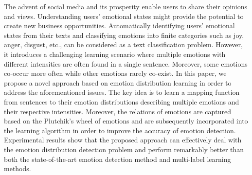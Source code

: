 The advent of social media and its prosperity enable users to share their opinions and views. Understanding users' emotional states might provide the potential to create new business opportunities. Automatically identifying users' emotional states from their texts and classifying emotions into finite categories such as joy, anger, disgust, etc., can be considered as a text classification problem. However, it introduces a challenging learning scenario where multiple emotions with different intensities are often found in a single sentence. Moreover, some emotions co-occur more often while other emotions rarely co-exist. In this paper, we propose a novel approach based on emotion distribution learning in order to address the aforementioned issues. The key idea is to learn a  mapping function from sentences to their emotion distributions describing multiple emotions and their respective intensities. Moreover, the relations of emotions are captured based on the Plutchik's wheel of emotions and are subsequently incorporated into the learning algorithm in order to improve the accuracy of emotion detection. Experimental results show that the proposed approach can effectively deal with the emotion distribution detection problem and perform remarkably better than both the state-of-the-art emotion detection method and multi-label learning methods.
